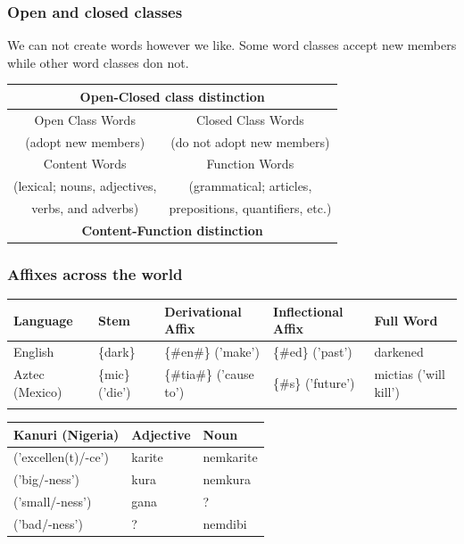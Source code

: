 \documentclass[12pt, table]{beamer}
\begin{document}
\begin{frame}
\frametitle{Open and closed classes}
We can not create words however we like. Some word classes accept new members while other word classes don not.\\[.5cm]
\footnotesize{
\begin{tabularx}{\textwidth}{c | c}
\hline
\multicolumn{2}{c}{\textbf{Open-Closed class distinction}}\\
\hline
Open Class Words  & Closed Class Words \\ 
(adopt new members) & (do not adopt new members) \\
\hline
Content Words & Function Words\\ 
(lexical; nouns, adjectives, & (grammatical; articles, \\
verbs, and adverbs) & prepositions, quantifiers, etc.)\\ 
\hline
\multicolumn{2}{c}{\textbf{Content-Function distinction}}\\
\hline
\end{tabularx}
}
\end{frame}

\begin{frame}
\frametitle{Affixes across the world}
\footnotesize{
\begin{tabularx}{\textwidth}{YYYYY}
\hline
\textbf{Language} & \textbf{Stem} & \textbf{Derivational Affix} & \textbf{Inflectional Affix} & \textbf{Full Word}\\
\hline
English & \{dark\} & \{\#en\#\} ('make') & \{\#ed\} ('past') & darkened\\
Aztec (Mexico) & \{mic\} ('die') & \{\#tia\#\} ('cause to') & \{\#s\} ('future') & mictias ('will kill') \\
\hline\\
\end{tabularx}
}
\footnotesize{
\begin{tabularx}{\textwidth}{lYY}
\hline
\textbf{Kanuri (Nigeria)} & \textbf{Adjective} & \textbf{Noun} \\
\hline
('excellen(t)/-ce') & karite  & nemkarite \\
('big/-ness')& kura  & nemkura \\
('small/-ness')& gana  &  ?  \\
('bad/-ness')&  ?  & nemdibi \\
\hline
\end{tabularx}
}
\end{frame}
\end{document}
